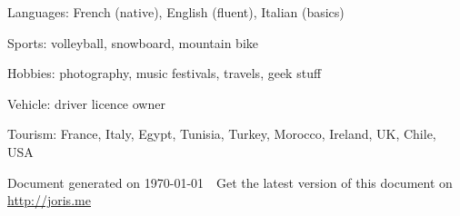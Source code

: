 \documentclass[letterpaper]{article}
\def\footerlink{http://joris.me}
\renewenvironment{itemize}{
    \begin{list}{}{
        \setlength{\leftmargin}{1.5em}
    }
}{
    \end{list}
}
\begin{document}
        \begin{itemize}
            \item Languages: French (native), English (fluent), Italian (basics)
            \item Sports: volleyball, snowboard, mountain bike
            \item Hobbies: photography, music festivals, travels, geek stuff
            \item Vehicle: driver licence owner
            \item Tourism: France, Italy, Egypt, Tunisia, Turkey, Morocco, Ireland, UK, Chile, USA
        \end{itemize}
        
    \vfill
    
    \begin{center}
        \begin{footnotesize}
            Document generated on \today \ \textendash\ Get the latest version of this document on \uline{\href{\footerlink}{ \footerlink}}
        \end{footnotesize}
    \end{center}
\end{document}
